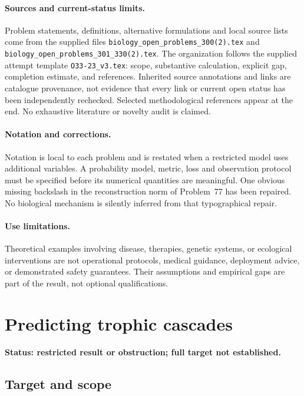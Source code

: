 \documentclass[11pt]{article}
\begin{document}
\paragraph{Sources and current-status limits.}
Problem statements, definitions, alternative formulations and local source lists
come from the supplied files
\texttt{biology\_open\_problems\_300(2).tex} and
\texttt{biology\_open\_problems\_301\_330(2).tex}.
The organization follows the supplied attempt template
\texttt{O33-23\_v3.tex}: scope, substantive calculation, explicit gap,
completion estimate, and references. Inherited source annotations and links are
catalogue provenance, not evidence that every link or current open status has
been independently rechecked. Selected methodological references appear at the
end. No exhaustive literature or novelty audit is claimed.

\paragraph{Notation and corrections.}
Notation is local to each problem and is restated when a restricted model uses
additional variables. A probability model, metric, loss and observation protocol
must be specified before its numerical quantities are meaningful. One obvious
missing backslash in the reconstruction norm of Problem~77 has been repaired.
No biological mechanism is silently inferred from that typographical repair.

\paragraph{Use limitations.}
Theoretical examples involving disease, therapies, genetic systems, or ecological
interventions are not operational protocols, medical guidance, deployment advice,
or demonstrated safety guarantees. Their assumptions and empirical gaps are part
of the result, not optional qualifications.


\section*{Predicting trophic cascades}
\label{prob:195}
\noindent\textbf{Status: restricted result or obstruction; full target not established.}
\subsection{Target and scope}
\end{document}
